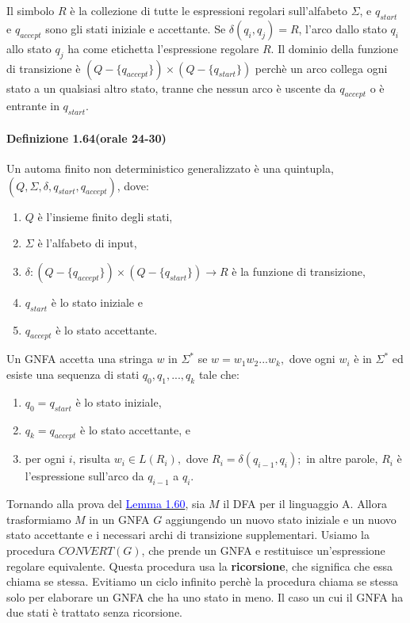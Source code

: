 \documentclass{article}
\begin{document}
Il simbolo $R$ è la collezione di tutte le espressioni regolari sull'alfabeto $\Sigma$, e $q_{start}$ e $q_{accept}$ sono gli stati iniziale e accettante.
Se $\delta(q_i,q_j) = R$, l'arco dallo stato $q_i$ allo stato $q_j$ ha come etichetta l'espressione regolare $R$.
Il dominio della funzione di transizione è $(Q - \{q_{accept} \}) \times (Q- \{q_{start} \})$ perchè un arco collega ogni stato a un qualsiasi altro stato, tranne che nessun arco è uscente da $q_{accept}$ o è entrante in $q_{start}$.

\paragraph{Definizione 1.64(orale 24-30)}
\text{ }

\begin{tcolorbox}[colback=yellow!10!white, colframe=yellow!50!black, title=Definizione 1.64 (orale 24-30)]
    Un automa finito non deterministico generalizzato è una quintupla, $(Q,\Sigma,\delta,q_{start},q_{accept})$, dove:
    \begin{enumerate}
        \item $Q$ è l'insieme finito degli stati,
        \item $\Sigma$ è l'alfabeto di input,
        \item $\delta: (Q - \{q_{accept}\}) \times (Q - \{q_{start}\}) \rightarrow R$ è la funzione di transizione,
        \item $q_{start}$ è lo stato iniziale e
        \item $q_{accept}$ è lo stato accettante.
    \end{enumerate}
\end{tcolorbox}

Un GNFA accetta una stringa $w$ in $\Sigma^{*}$ se $w = w_{1}w_{2}...w_{k},$ dove ogni $w_{i}$ è in $\Sigma^{*}$ ed esiste una sequenza di stati $q_{0},q_{1},...,q_{k}$ tale che:
\begin{enumerate}
    \item $q_{0}= q_{start}$ è lo stato iniziale,
    \item $q_{k}= q_{accept}$ è lo stato accettante, e
    \item per ogni $i$, risulta $w_{i}\in L(R_{i}),$ dove $R_{i}= \delta(q_{i-1},q_{i});$ in altre parole, $R_{i}$ è l'espressione sull'arco da $q_{i-1}$ a $q_{i}$.
\end{enumerate}

Tornando alla prova del \hyperref[lemma-1.60]{\textcolor{blue}{Lemma 1.60}}, sia $M$ il DFA per il linguaggio A.
Allora trasformiamo $M$ in un GNFA $G$ aggiungendo un nuovo stato iniziale e un nuovo stato accettante e i necessari archi di transizione supplementari.
Usiamo la procedura $CONVERT(G)$, che prende un GNFA e restituisce un'espressione regolare equivalente. 
Questa procedura usa la \textbf{ricorsione}, che significa che essa chiama se stessa. 
Evitiamo un ciclo infinito perchè la procedura chiama se stessa solo per elaborare un GNFA che ha uno stato in meno.
Il caso un cui il GNFA ha due stati è trattato senza ricorsione.
\vspace{1em}
\end{document}
